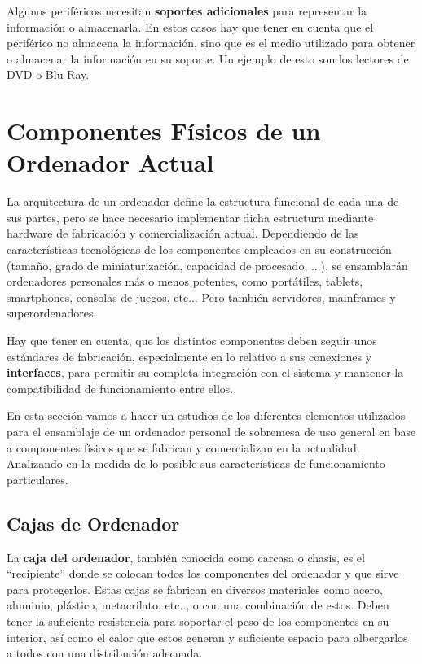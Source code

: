 Algunos periféricos necesitan \textbf{soportes adicionales} para representar la información o almacenarla. En estos casos hay que tener en cuenta que el periférico no almacena la información, sino que es el medio utilizado para obtener o almacenar la información en su soporte. Un ejemplo de esto son los lectores de DVD o Blu-Ray.

\section{Componentes Físicos de un Ordenador Actual}
La arquitectura de un ordenador define la estructura funcional de cada una de sus partes, pero se hace necesario implementar dicha estructura mediante hardware de fabricación y comercialización actual. Dependiendo de  las características tecnológicas de los componentes empleados en su construcción (tamaño, grado de miniaturización, capacidad de procesado, ...), se ensamblarán ordenadores personales más o menos potentes, como portátiles, tablets, smartphones, consolas de juegos, etc... Pero también servidores, mainframes y superordenadores.

Hay que tener en cuenta, que los distintos componentes deben seguir unos estándares de fabricación, especialmente en lo relativo a sus conexiones y \textbf{\gls{interfaces}}, para permitir su completa integración con el sistema y mantener la compatibilidad de funcionamiento entre ellos.

En esta sección vamos a hacer un estudios de los diferentes elementos utilizados para el ensamblaje de un ordenador personal de sobremesa de uso general en base a componentes físicos que se fabrican y comercializan en la actualidad. Analizando en la medida de lo posible sus características de funcionamiento particulares.

\subsection{Cajas de Ordenador}
La \textbf{caja del ordenador}, también conocida como carcasa o chasis, es el ``recipiente'' donde se colocan todos los componentes del ordenador y que sirve para protegerlos. Estas cajas se fabrican en diversos materiales como acero, aluminio, plástico, metacrilato, etc.., o con una combinación de estos. Deben tener la suficiente resistencia para soportar el peso de los componentes en su interior, así como el calor que estos generan y suficiente espacio para albergarlos a todos con una distribución adecuada.

